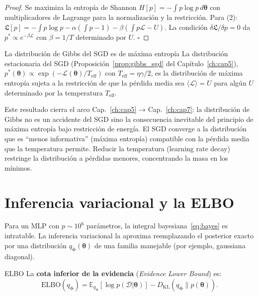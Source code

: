 \begin{proof}
Se maximiza la entropía de Shannon $H[p] = -\int p\log p\,d\bm{\theta}$
con multiplicadores de Lagrange para la normalización y la restricción.
Para (2): $\mathfrak{L}[p] = -\int p\log p - \alpha(\int p - 1) -
\beta(\int p\mathcal{L} - U)$. La condición
$\delta\mathfrak{L}/\delta p = 0$ da
$p^* \propto e^{-\beta\mathcal{L}}$ con $\beta = 1/T$ determinado
por $U$. $\square$
\end{proof}

\begin{proposicion}{La distribución de Gibbs del SGD es de máxima entropía}
\label{prop:gibbs_maxent}
La distribución estacionaria del SGD
(Proposición~\ref{prop:gibbs_sgd} del Capítulo~\ref{ch:cap5}),
$p^*(\bm{\theta}) \propto
\exp(-\mathcal{L}(\bm{\theta})/T_{\text{eff}})$ con
$T_{\text{eff}} = \eta\gamma/2$, es la distribución de máxima
entropía sujeta a la restricción de que la pérdida media sea
$\langle\mathcal{L}\rangle = U$ para algún $U$ determinado por la
temperatura $T_{\text{eff}}$.
\end{proposicion}

Este resultado cierra el arco Cap.~\ref{ch:cap5} → Cap.~\ref{ch:cap7}:
la distribución de Gibbs no es un accidente del SGD sino la consecuencia
inevitable del principio de máxima entropía bajo restricción de energía.
El SGD converge a la distribución que es ``menos informativa'' (máxima
entropía) compatible con la pérdida media que la temperatura permite.
Reducir la temperatura (learning rate decay) restringe la distribución a
pérdidas menores, concentrando la masa en los mínimos.

\section{Inferencia variacional y la ELBO}
\label{sec:vi}


Para un MLP con $p \sim 10^6$ parámetros, la integral
bayesiana~\eqref{eq:bayes} es intratable. La inferencia variacional la
aproxima reemplazando el posterior exacto por una distribución
$q_{\bm{\phi}}(\bm{\theta})$ de una familia manejable (por ejemplo,
gaussiana diagonal).

\begin{definicion}{ELBO}
\label{def:elbo}
La \textbf{cota inferior de la evidencia} (\textit{Evidence Lower Bound})
es:
\begin{equation}
  \text{ELBO}(q_{\bm{\phi}})
  = \mathbb{E}_{q_{\bm{\phi}}}[\log p(\mathcal{D}|\bm{\theta})]
  - D_{\text{KL}}(q_{\bm{\phi}}\|p(\bm{\theta})).
  \label{eq:elbo}
\end{equation}
\end{definicion}

